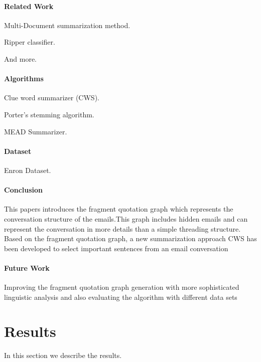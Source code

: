 \documentclass[12pt]{article}
\newenvironment{my_itemize}
{\begin{itemize}
  \setlength{\itemsep}{0cm}
  \setlength{\parskip}{0cm}}
{\end{itemize}}
\begin{document}
\paragraph{Related Work}
\begin{my_itemize}
  \item Multi-Document summarization method.
  \item Ripper classifier.
  \item And more.
\end{my_itemize}

\paragraph{Algorithms}
\begin{my_itemize}
  \item Clue word summarizer (CWS).
  \item Porter’s stemming algorithm.
  \item MEAD Summarizer.
\end{my_itemize}

\paragraph{Dataset} Enron Dataset.

\paragraph{Conclusion}
This papers introduces the fragment quotation graph which represents the 
conversation structure of the emails.This graph includes hidden emails and can 
represent the conversation in more details than a simple threading structure. 
Based on the fragment quotation graph, a new summarization approach CWS has 
been developed to select important sentences from an email conversation

\paragraph{Future Work}
Improving the fragment quotation graph generation with more sophisticated linguistic
analysis and also evaluating the algorithm with different data sets



\section{Results}\label{results}
In this section we describe the results.
\end{document}
